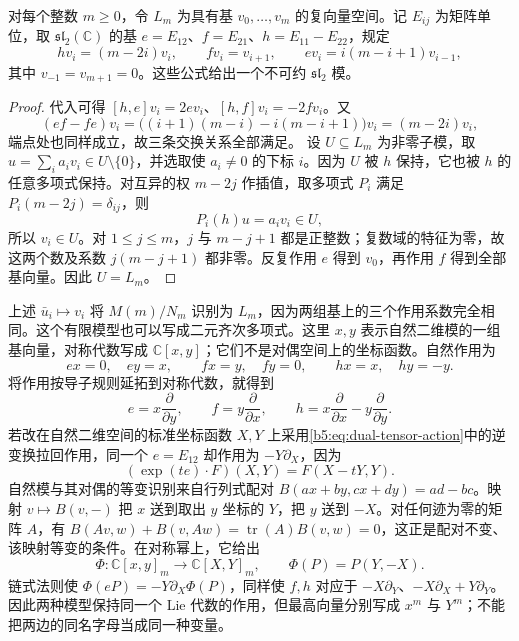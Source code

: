 \begin{proposition}\label{b5:prop:sl2-model}
	对每个整数 \(m\ge0\)，令 \(L_m\) 为具有基 \(v_0,\ldots,v_m\) 的复向量空间。记 \(E_{ij}\) 为矩阵单位，取 \(\mathfrak{sl}_2(\mathbb C)\) 的基 \(e=E_{12}\)、\(f=E_{21}\)、\(h=E_{11}-E_{22}\)，规定
	\[
		hv_i=(m-2i)v_i,\qquad fv_i=v_{i+1},\qquad ev_i=i(m-i+1)v_{i-1},
	\]
	其中 \(v_{-1}=v_{m+1}=0\)。这些公式给出一个不可约 \(\mathfrak{sl}_2\) 模。
\end{proposition}
\begin{proof}
	代入可得 \([h,e]v_i=2ev_i\)、\([h,f]v_i=-2fv_i\)。又
	\[
		(ef-fe)v_i =\bigl((i+1)(m-i)-i(m-i+1)\bigr)v_i =(m-2i)v_i,
	\]
	端点处也同样成立，故三条交换关系全部满足。 设 \(U\subseteq L_m\) 为非零子模，取 \(u=\sum_i a_iv_i\in U\setminus\{0\}\)，并选取使 \(a_i\ne0\) 的下标 \(i\)。因为 \(U\) 被 \(h\) 保持，它也被 \(h\) 的任意多项式保持。对互异的权 \(m-2j\) 作插值，取多项式 \(P_i\) 满足 \(P_i(m-2j)=\delta_{ij}\)，则
	\[
		P_i(h)u=a_iv_i\in U,
	\]
	所以 \(v_i\in U\)。对 \(1\le j\le m\)，\(j\) 与 \(m-j+1\) 都是正整数；复数域的特征为零，故这两个数及系数 \(j(m-j+1)\) 都非零。反复作用 \(e\) 得到 \(v_0\)，再作用 \(f\) 得到全部基向量。因此 \(U=L_m\)。
\end{proof}
上述 \(\bar u_i\mapsto v_i\) 将 \(M(m)/N_m\) 识别为 \(L_m\)，因为两组基上的三个作用系数完全相同。这个有限模型也可以写成二元齐次多项式。这里 \(x,y\) 表示自然二维模的一组基向量，对称代数写成 \(\mathbb C[x,y]\)；它们不是对偶空间上的坐标函数。自然作用为
\[
	ex=0,\quad ey=x,\qquad fx=y,\quad fy=0,\qquad hx=x,\quad hy=-y.
\]
将作用按导子规则延拓到对称代数，就得到
\[
	e=x\frac{\partial}{\partial y},\qquad f=y\frac{\partial}{\partial x},\qquad h=x\frac{\partial}{\partial x}-y\frac{\partial}{\partial y}.
\]
若改在自然二维空间的标准坐标函数 \(X,Y\) 上采用\eqref{b5:eq:dual-tensor-action}中的逆变换拉回作用，同一个 \(e=E_{12}\) 却作用为 \(-Y\partial_X\)，因为
\[
	(\exp(te)\cdot F)(X,Y)=F(X-tY,Y).
\]
自然模与其对偶的等变识别来自行列式配对 \(B(ax+by,cx+dy)=ad-bc\)。映射 \(v\mapsto B(v,-)\) 把 \(x\) 送到取出 \(y\) 坐标的 \(Y\)，把 \(y\) 送到 \(-X\)。对任何迹为零的矩阵 \(A\)，有 \(B(Av,w)+B(v,Aw)=\operatorname{tr}(A)B(v,w)=0\)，这正是配对不变、该映射等变的条件。在对称幂上，它给出
\[
	\Phi:\mathbb C[x,y]_m\longrightarrow\mathbb C[X,Y]_m, \qquad \Phi(P)=P(Y,-X).
\]
链式法则使 \(\Phi(eP)=-Y\partial_X\Phi(P)\)，同样使 \(f,h\) 对应于 \(-X\partial_Y\)、\(-X\partial_X+Y\partial_Y\)。因此两种模型保持同一个 Lie 代数的作用，但最高向量分别写成 \(x^m\) 与 \(Y^m\)；不能把两边的同名字母当成同一种变量。

